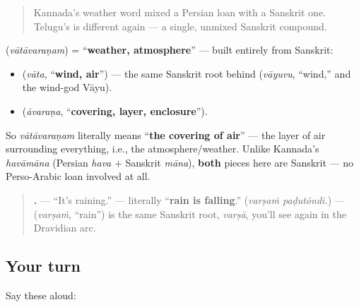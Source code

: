 \label{lesson:TE-C20-vatavaranam}



\begin{quote}
Kannada's weather word mixed a Persian loan with a Sanskrit one. Telugu's is different again — a single, unmixed Sanskrit compound.
\end{quote}

\begin{cousinweb}
\textbf{} (\emph{vātāvaraṇam}) = \textquotedblleft{}\textbf{weather, atmosphere}\textquotedblright{} — built entirely from Sanskrit:

\begin{itemize}
\raggedright
  \item \textbf{} (\emph{vāta}, \textquotedblleft{}\textbf{wind, air}\textquotedblright{}) — the same Sanskrit root behind \textbf{} (\emph{vāyuvu}, \textquotedblleft{}wind,\textquotedblright{} and the wind-god Vāyu).
  \item \textbf{} (\emph{āvaraṇa}, \textquotedblleft{}\textbf{covering, layer, enclosure}\textquotedblright{}).
\end{itemize}

So \emph{vātāvaraṇam} literally means \textquotedblleft{}\textbf{the covering of air}\textquotedblright{} — the layer of air surrounding everything, i.e., the atmosphere/weather. Unlike Kannada's \emph{havāmāna} (Persian \emph{hava} + Sanskrit \emph{māna}), \textbf{both} pieces here are Sanskrit — no Perso-Arabic loan involved at all.
\end{cousinweb}

\begin{grammarlens}[title={Grammar Lens: \te{వర్షం} \te{పడుతోంది} — \textquotedblleft{}rain is falling\textquotedblright{}}]
\begin{quote}
\textbf{ .} — \textquotedblleft{}It's raining.\textquotedblright{} — literally \textquotedblleft{}\textbf{rain is falling}.\textquotedblright{} (\emph{varṣaṁ paḍutōndi.}) — \textbf{} (\emph{varṣaṁ}, \textquotedblleft{}rain\textquotedblright{}) is the same Sanskrit root, \emph{varṣā}, you'll see again in the Dravidian arc.
\end{quote}
\end{grammarlens}

\subsection*{Your turn}
Say these aloud:

